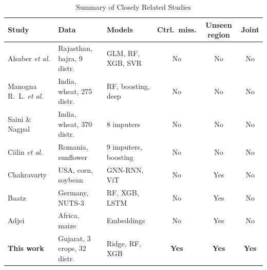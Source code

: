 \begin{table}[!t]
\caption{Summary of Closely Related Studies}\label{tab:related}
\centering\footnotesize
\setlength{\tabcolsep}{3pt}
\begin{tabular}{p{1.55cm}p{1.6cm}p{1.35cm}ccc}
\toprule
Study & Data & Models & Ctrl.\ miss. & Unseen region & Joint \\
\midrule
Alsaber \emph{et al.} \cite{alsaber2025} & Rajasthan, bajra, 9 distr. & GLM, RF, XGB, SVR & No & No & No \\
Manogna R.~L. \emph{et al.} \cite{manogna2026} & India, wheat, 275 distr. & RF, boosting, deep & No & No & No \\
Saini \& Nagpal \cite{saini2024} & India, wheat, 370 distr. & 8 imputers & No & No & No \\
Călin \emph{et al.} \cite{calin2023} & Romania, sunflower & 9 imputers, boosting & No & No & No \\
Chakravarty \cite{chakravarty2026} & USA, corn, soybean & GNN-RNN, ViT & No & Yes & No \\
Baatz \cite{baatz2025} & Germany, NUTS-3 & RF, XGB, LSTM & No & Yes & No \\
Adjei \cite{adjei2026} & Africa, maize & Embeddings & No & Yes & No \\
\textbf{This work} & Gujarat, 3 crops, 32 distr. & Ridge, RF, XGB & \textbf{Yes} & \textbf{Yes} & \textbf{Yes} \\
\bottomrule
\end{tabular}

\vspace{2pt}{\scriptsize Ctrl.\ miss.: missingness simulated at controlled rates and patterns;
Joint: both conditions evaluated together.}
\end{table}
